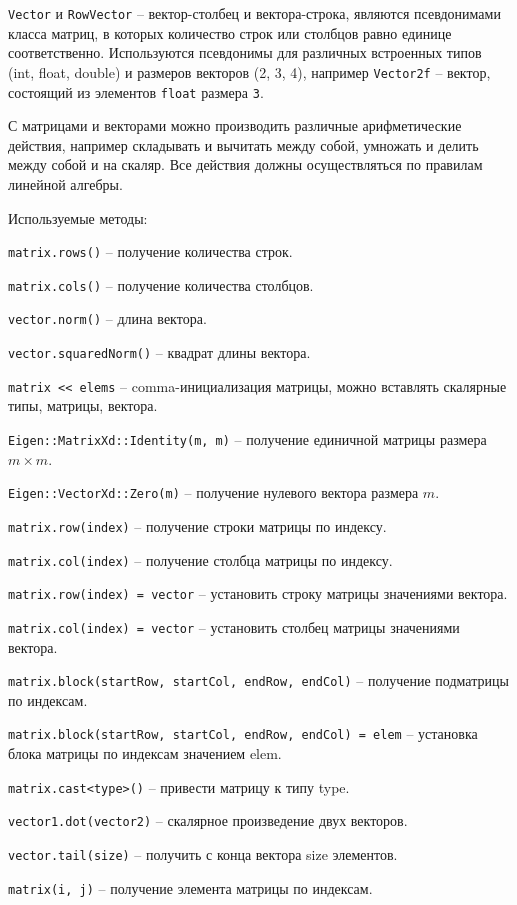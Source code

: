 \verb!Vector! и \verb!RowVector! -- вектор-столбец и вектора-строка, являются псевдонимами класса матриц, в которых количество строк или столбцов равно единице соответственно. Используются псевдонимы для различных встроенных типов (int, float, double) и размеров векторов (2, 3, 4), например \verb!Vector2f! -- вектор, состоящий из элементов \verb!float! размера \verb!3!.

С матрицами и векторами можно производить различные арифметические действия, например складывать и вычитать между собой, умножать и делить между собой и на скаляр. Все действия должны осуществляться по правилам линейной алгебры. 

Используемые методы:

\verb!matrix.rows()! -- получение количества строк.

\verb!matrix.cols()! -- получение количества столбцов.

\verb!vector.norm()! -- длина вектора.

\verb!vector.squaredNorm()! -- квадрат длины вектора.

\verb!matrix << elems! -- comma-инициализация матрицы, можно вставлять скалярные типы, матрицы, вектора.

\verb!Eigen::MatrixXd::Identity(m, m)! -- получение единичной матрицы размера $ m \times m $.

\verb!Eigen::VectorXd::Zero(m)! -- получение нулевого вектора размера $ m $.

\verb!matrix.row(index)! -- получение строки матрицы по индексу.

\verb!matrix.col(index)! -- получение столбца матрицы по индексу.

\verb!matrix.row(index) = vector! -- установить строку матрицы значениями вектора.

\verb!matrix.col(index) = vector! -- установить столбец матрицы значениями вектора.

\verb!matrix.block(startRow, startCol, endRow, endCol)! -- получение подматрицы по индексам.

\verb!matrix.block(startRow, startCol, endRow, endCol) = elem! -- установка блока матрицы по индексам значением elem.

\verb!matrix.cast<type>()! -- привести матрицу к типу type.

\verb!vector1.dot(vector2)! -- скалярное произведение двух векторов.

\verb!vector.tail(size)! -- получить с конца вектора size элементов.

\verb!matrix(i, j)! -- получение элемента матрицы по индексам.

